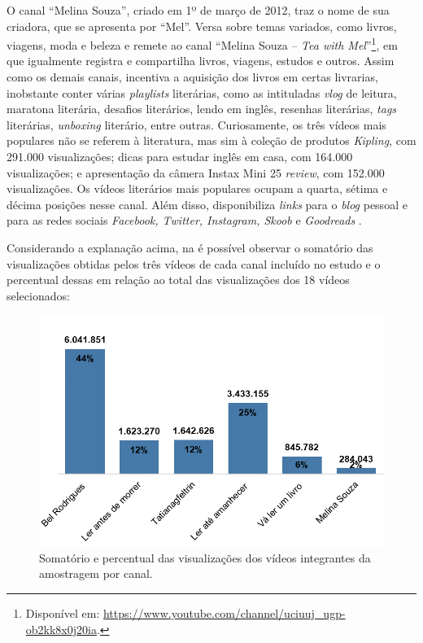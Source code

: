 \documentclass[portuguese]{textolivre}
\begin{document}
O canal ``Melina Souza'', criado em 1º de março de 2012, traz o nome de
sua criadora, que se apresenta por ``Mel''. Versa sobre temas variados,
como livros, viagens, moda e beleza e remete ao canal ``Melina Souza --
\emph{Tea with Mel}''\footnote{Disponível em:
  \url{https://www.youtube.com/channel/uciuuj\_ugp-ob2kk8x0j20ia}.}, em que
igualmente registra e compartilha livros, viagens, estudos e outros.
Assim como os demais canais, incentiva a aquisição dos livros em certas
livrarias, inobstante conter várias \emph{playlists} literárias, como as
intituladas \emph{vlog }de leitura, maratona literária, desafios
literários, lendo em inglês, resenhas literárias, \emph{tags}
literárias, \emph{unboxing} literário, entre outras. Curiosamente, os
três vídeos mais populares não se referem à literatura, mas sim à
coleção de produtos \emph{Kipling}, com 291.000 visualizações; dicas
para estudar inglês em casa, com 164.000 visualizações; e apresentação
da câmera Instax Mini 25 \emph{review}, com 152.000 visualizações. Os
vídeos literários mais populares ocupam a quarta, sétima e décima
posições nesse canal. Além disso, disponibiliza \emph{links} para o
\emph{blog} pessoal e para as redes sociais \emph{Facebook, Twitter,
Instagram, Skoob} e \emph{Goodreads} \cite{souza2021}.%

Considerando a explanação acima, na  é possível observar
o somatório das visualizações obtidas pelos três vídeos de cada canal
incluído no estudo e o percentual dessas em relação ao total das
visualizações dos 18 vídeos selecionados:

\begin{figure}[h!]
\centering
\begin{minipage}{.75\textwidth}
\includegraphics[width=\textwidth]{figure01.png}  
\caption{Somatório e percentual das visualizações dos vídeos integrantes da amostragem por canal.}\label{fig01}
\end{minipage}
\end{figure}
\end{document}
